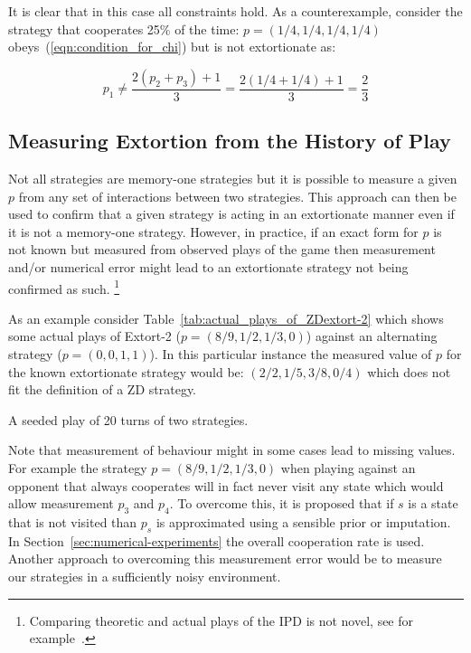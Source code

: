 \documentclass[a4paper]{article}
\begin{document}
It is clear that in this case all constraints hold. As a counterexample,
consider the strategy that cooperates 25\% of the time: \(p=(1 /4, 1 / 4, 1 / 4,
1 / 4)\) obeys~(\ref{eqn:condition_for_chi}) but is not extortionate as:

\begin{equation}
    p_1 \ne \frac{2(p_2 + p_3) + 1}{3}
        = \frac{2(1 / 4 + 1 / 4) + 1}{3}
        = \frac{2}{3}
\end{equation}

\subsection{Measuring Extortion from the History of Play}

Not all strategies are memory-one strategies but it is possible to
measure a given \(p\) from any set of interactions between two strategies.
This approach can then be used to confirm that a given strategy is acting
in an extortionate manner even if it is not a memory-one strategy. However, in
practice, if an exact form for \(p\) is not known but measured from observed
plays of the game then measurement and/or numerical error might lead to an
extortionate strategy not being confirmed as such. \footnote{Comparing theoretic
and actual plays of the IPD is not novel, see for example~\cite{Rand2013}.}


As an example consider Table~\ref{tab:actual_plays_of_ZDextort-2} which shows
some actual plays of Extort-2 (\(p=(8 / 9, 1 / 2, 1 / 3, 0)\)) against an
alternating strategy (\(p=(0, 0, 1, 1)\)). In this particular instance the
measured value of \(p\) for the known extortionate strategy would be:
\((2/2, 1/5, 3/8, 0/4)\) which does not fit the definition of a ZD strategy.


\begin{table}[!hbtp]
    
    \caption{A seeded play of 20 turns of two strategies.}
    \label{tab:actual_plays_of_ZDextort-2}
\end{table}


Note that measurement of behaviour might in some cases lead to missing values.
For example the strategy \(p=(8 / 9, 1 / 2, 1 / 3, 0)\) when playing against an
opponent that always cooperates will in fact never visit any state which would allow measurement
\(p_3\) and \(p_4\). To overcome this, it is proposed that if \(s\) is a state
that is not visited than \(p_s\) is approximated using a sensible prior or
imputation. In Section~\ref{sec:numerical-experiments} the overall cooperation
rate is used. Another approach to overcoming this measurement error would be to
measure our strategies in a sufficiently noisy environment.
\end{document}
